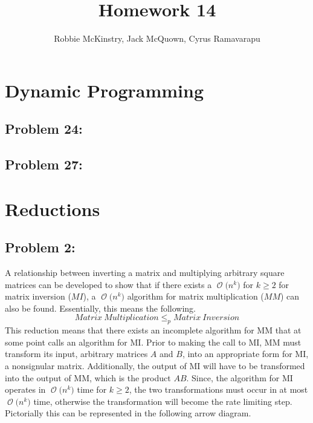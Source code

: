 \documentclass[12pt]{article}
\newcommand{\BigO}[1]{\ensuremath{\operatorname{\mathcal{O}}\bigl(#1\bigr)}}
\begin{document}
\title{Homework 14}
\author{Robbie McKinstry, Jack McQuown, Cyrus Ramavarapu}
\renewcommand{\today}{3 October 2016}
\renewcommand{\baselinestretch}{1.5}
\maketitle

\section*{Dynamic Programming}
\subsection*{Problem 24:}
\subsection*{Problem 27:}

\section*{Reductions}
\subsection*{Problem 2:}
A relationship between inverting a matrix and multiplying arbitrary
square matrices can be developed to show that if there exists a
\BigO{n^k} for $k\geq2$ for matrix inversion ($MI$), a \BigO{n^k} algorithm
for matrix multiplication ($MM$) can also be found.  Essentially, this
means the following.
\[
Matrix\ Multiplication\leq_{p} Matrix\ Inversion  
\]
This reduction means that there exists an incomplete algorithm for
MM that at some point calls an algorithm for MI\@.  Prior to making the
call to MI, MM must transform its input, arbitrary matrices $A$ and $B$,
into an appropriate form for MI, a nonsignular matrix.  Additionally,
the output of MI will have to be transformed into the output of MM,
which is the product $AB$. Since, the  algorithm for MI operates in
\BigO{n^k} time for $k\geq2$, the two transformations must occur in
at most \BigO{n^k} time, otherwise the transformation will become
the rate limiting step. Pictorially this can be represented in the
following arrow diagram.
\begin{center}
\end{center}
\end{document}
